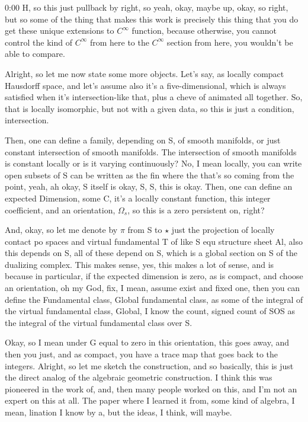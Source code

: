 \begin{unfinished}{0:00}
H, so this just pullback by right, so yeah, okay, maybe up, okay, so right, but so some of the thing that makes this work is precisely this thing that you do get these unique extensions to $C^\infty$ function, because otherwise, you cannot control the kind of $C^\infty$ from here to the $C^\infty$ section from here, you wouldn't be able to compare.

Alright, so let me now state some more objects. Let's say, as locally compact Hausdorff space, and let's assume also it's a five-dimensional, which is always satisfied when it's intersection-like that, plus a cheve of animated all together. So, that is locally isomorphic, but not with a given data, so this is just a condition, intersection. 

Then, one can define a family, depending on S, of smooth manifolds, or just constant intersection of smooth manifolds. The intersection of smooth manifolds is constant locally or is it varying continuously? No, I mean locally, you can write open subsets of S can be written as the fin where the that's so coming from the point, yeah, ah okay, S itself is okay, S, S, this is okay. Then, one can define an expected Dimension, some C, it's a locally constant function, this integer coefficient, and an orientation, $\Omega_s$, so this is a zero persistent on, right?

And, okay, so let me denote by $\pi$ from S to $\star$ just the projection of locally contact po spaces and virtual fundamental T of like S equ structure sheet Al, also this depends on S, all of these depend on S, which is a global section on S of the dualizing complex. This makes sense, yes, this makes a lot of sense, and is because in particular, if the expected dimension is zero, as is compact, and choose an orientation, oh my God, fix, I mean, assume exist and fixed one, then you can define the Fundamental class, Global fundamental class, as some of the integral of the virtual fundamental class, Global, I know the count, signed count of SOS as the integral of the virtual fundamental class over S.

Okay, so I mean under G equal to zero in this orientation, this goes away, and then you just, and as compact, you have a trace map that goes back to the integers. Alright, so let me sketch the construction, and so basically, this is just the direct analog of the algebraic geometric construction. I think this was pioneered in the work of, and, then many people worked on this, and I'm not an expert on this at all. The paper where I learned it from, some kind of algebra, I mean, lination I know by a, but the ideas, I think, will maybe. 


\end{unfinished}
